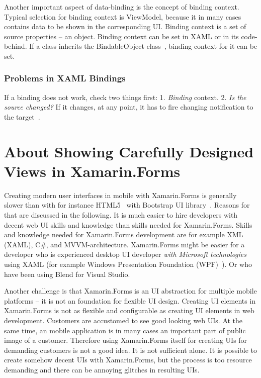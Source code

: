 \documentclass[conference]{IEEEtran}
\begin{document}
Another important aspect of data-binding is the concept of binding context. Typical selection for binding context is  ViewModel, because it in many cases contains data to be shown in the corresponding UI. Binding context is a set of source properties -- an object. Binding context can be set in XAML or in its code-behind. If a class inherits the  BindableObject class~\cite{BindableObject}, binding context for it can be set.

\subsubsection{Problems in XAML Bindings}

If a binding does not work, check two things first: 1. \emph{Binding} context. 2. \emph{Is the source changed?} If it changes, at any point, it has to fire changing notification to the target~\cite{inotifypropertychanged}.

\section{About Showing Carefully Designed Views in Xamarin.Forms}

Creating modern user interfaces in mobile with Xamarin.Forms is generally slower than with for instance HTML5~\cite{html5} with Bootstrap UI library~\cite{bootstrap}. Reasons for that are discussed in the following. It is much easier to hire developers with decent web UI skills and knowledge than skills needed for Xamarin.Forms. Skills and knowledge needed for Xamarin.Forms development are for example XML (XAML), C\#, and MVVM-architecture. Xamarin.Forms might be easier for a developer who is experienced desktop UI developer \emph{with Microsoft technologies} using XAML (for example Windows Presentation Foundation (WPF)~\cite{wpf}). Or who have been using Blend for Visual Studio.

Another challenge is that Xamarin.Forms is an UI abstraction for multiple mobile platforms -- it is not an foundation for flexible UI design. Creating UI elements in Xamarin.Forms is not as flexible and configurable as creating UI elements in web development. Customers are accustomed to see good looking web UIs. At the same time, an mobile application is in many cases an important part of public image of a customer. Therefore using Xamarin.Forms itself for creating UIs for demanding customers is not a good idea. It is not sufficient alone. It is possible to create somehow decent UIs with Xamarin.Forms, but the process is too resource demanding and there can be annoying glitches in resulting UIs.
\end{document}
